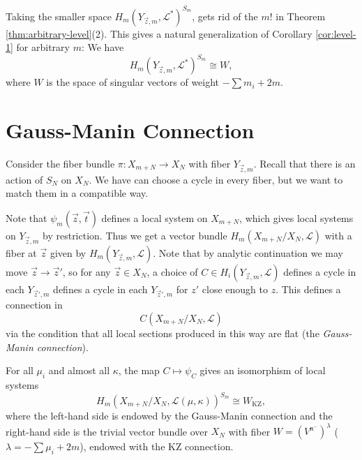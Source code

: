 \begin{remark}
  Taking the smaller space
  $H_m(Y_{\vec{z}, m}, \mathcal{L}^*)^{S_m}$,
  gets rid of the $m!$
  in Theorem \ref{thm:arbitrary-level}(2).
  This gives a natural generalization of
  Corollary \ref{cor:level-1} for arbitrary
  $m$: We have
  \[
    H_m(Y_{\vec{z}, m}, \mathcal{L}^*)^{S_m}
    \cong W,
  \]
  where $W$ is the space of singular
  vectors of weight
  $-\sum m_i + 2m$.
\end{remark}

\section{Gauss-Manin Connection}

\begin{remark}
  Consider the fiber bundle 
  $\pi : X_{m + N} \to X_N$
  with fiber $Y_{\vec{z}, m}$.
  Recall that there is an action of $S_N$
  on $X_N$. We have can choose a cycle in
  every fiber, but we want to match them in
  a compatible way.

  Note that
  $\psi_m(\vec{z}, \vec{t})$
  defines a local system
  on $X_{m + N}$, which gives local
  systems on $Y_{\vec{z}, m}$
  by restriction.
  Thus we get a vector bundle
  $H_m(X_{m + N} / X_N, \mathcal{L})$
  with a fiber at $\vec{z}$
  given by $H_m(Y_{\vec{z}, m}, \mathcal{L})$.
  Note that by analytic continuation we may
  move $\vec{z} \to \vec{z}'$, so for any
  $\vec{z} \in X_N$,
  a choice of
  $C \in H_i(Y_{\vec{z}, m}, \mathcal{L})$
  defines a cycle in each
  $Y_{\vec{z}', m}$ defines a cycle in
  each $Y_{\vec{z}', m}$ for $z'$
  close enough to $z$.
  This defines a connection
  in
  \[
    C(X_{m + N} / X_N, \mathcal{L})
  \]
  via the condition that all local sections
  produced in this way are flat
  (the \emph{Gauss-Manin connection}).
\end{remark}

\begin{theorem}\label{thm:gauss-manin-kz}
  For all $\mu_i$ and almost all $\kappa$,
  the map $C \mapsto \psi_C$ gives an
  isomorphism of local systems
  \[
    H_m(X_{m + N} / X_N, \mathcal{L}(\mu, \kappa))^{S_m}
    \cong W_{\mathrm{KZ}},
  \]
  where the left-hand side is endowed by
  the Gauss-Manin connection
  and the right-hand side is the
  trivial vector bundle over
  $X_N$ with fiber
  $W = (V^{\mathfrak{n}^-})^\lambda$
  ($\lambda = -\sum \mu_i + 2m$),
  endowed with the KZ connection.
\end{theorem}

